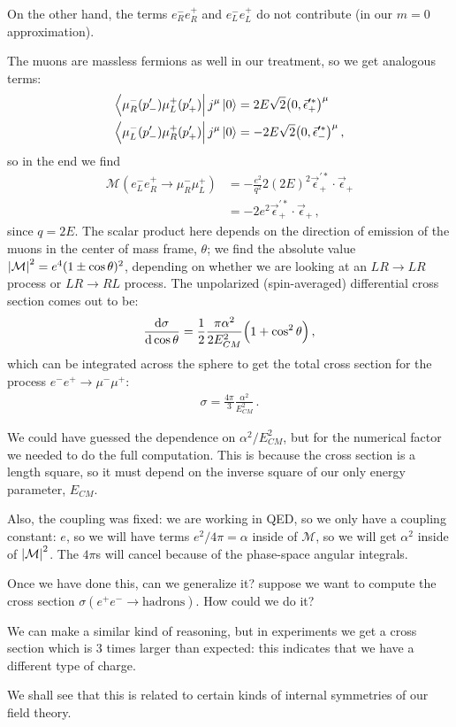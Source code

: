 \documentclass[main.tex]{subfiles}
\begin{document}
On the other hand, the terms \(e_{R}^{-} e_{R}^{+}\) and \(e_{L}^{-} e_{L}^{+}\) do not contribute (in our \(m = 0\) approximation).

The muons are massless fermions as well in our treatment, so we get analogous terms: 
%
\begin{align}
\bra{\mu^-_R (p'_-) \mu^+_L (p'_+)} j^{\mu } \ket{0} &= 2E \sqrt{2} \qty(0, \vec{\epsilon}^{\prime *}_+)^{\mu } \\
\bra{\mu^-_L (p'_-) \mu^+_R (p'_+)} j^{\mu } \ket{0} &= - 2E \sqrt{2} \qty(0, \vec{\epsilon}^{\prime *}_-)^{\mu }
\,,
\end{align}
%
so in the end we find 
%
\begin{align}
\mathcal{M} (e^{-}_{L} e^{+}_{R} \to \mu^-_R \mu^+_L) 
&= - \frac{e^2}{q^2} 2 (2E)^2 
\vec{\epsilon}^{\prime *}_{+} \cdot \vec{\epsilon}_{+}  \\
&= - 2 e^2 \vec{\epsilon}^{\prime *}_{+} \cdot \vec{\epsilon}_{+}
\,,
\end{align}
%
since \(q  =2 E\). 
The scalar product here depends on the direction of emission of the muons in the center of mass frame, \(\theta \); we find the absolute value \(\abs{\mathcal{M}}^2 = e^{4} (1 \pm \cos \theta )^2\), depending on whether we are looking at an \(LR \to LR\) process or \(LR \to RL\) process. The unpolarized (spin-averaged) differential cross section comes out to be: 
%
\begin{align}
\dv{\sigma }{\cos \theta } = \frac{1}{2} \frac{\pi \alpha^2}{2 E_{CM}^2} \qty(1 + \cos^2\theta )
\,,
\end{align}
%
which can be integrated across the sphere to get the total cross section for the process \(e^{-} e^{+} \to \mu^- \mu^+\): 
%
\begin{align}
\sigma = \frac{4 \pi }{3} \frac{\alpha^2}{E^2_{CM}}
\,.
\end{align}

We could have guessed the dependence on \(\alpha^2  / E^2_{CM}\), but for the numerical factor we needed to do the full computation. 
This is because the cross section is a length square, so it must depend on the inverse square of our only energy parameter, \(E_{CM}\). 

Also, the coupling was fixed: we are working in QED, so we only have a coupling constant: \(e\), so we will have terms \(e^2 / 4 \pi = \alpha \) inside of \(\mathcal{M}\), so we will get \(\alpha^2\) inside of \(\abs{\mathcal{M}}^2\). 
The \(4 \pi \)s will cancel because of the phase-space angular integrals.

Once we have done this, can we generalize it? suppose we want to compute the cross section \(\sigma (e^{+}e^{-} \to \text{hadrons})\). How could we do it?

We can make a similar kind of reasoning, but in experiments we get a cross section which is 3 times larger than expected: this indicates that we have a different type of charge.

We shall see that this is related to certain kinds of internal symmetries of our field theory. 
\end{document}

